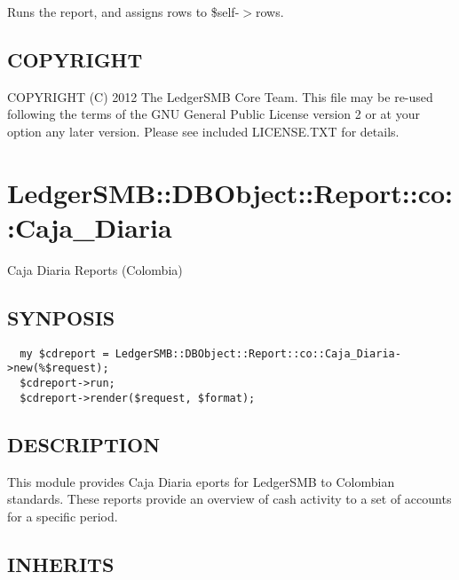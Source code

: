 \begin{description}
\begin{description}
\begin{description}
Runs the report, and assigns rows to \$self-$>$rows.

\subsection*{COPYRIGHT\label{LedgerSMB::DBObject::Report::co::Balance_y_Mayor_COPYRIGHT}}


COPYRIGHT (C) 2012 The LedgerSMB Core Team.  This file may be re-used following
the terms of the GNU General Public License version 2 or at your option any
later version.  Please see included LICENSE.TXT for details.

\section{LedgerSMB::DBObject::Report::co::Caja\_Diaria\label{LedgerSMB::DBObject::Report::co::Caja_Diaria}}


Caja Diaria Reports (Colombia)

\subsection*{SYNPOSIS\label{LedgerSMB::DBObject::Report::co::Caja_Diaria_SYNPOSIS}}
\begin{verbatim}
  my $cdreport = LedgerSMB::DBObject::Report::co::Caja_Diaria->new(%$request);
  $cdreport->run;
  $cdreport->render($request, $format);
\end{verbatim}
\subsection*{DESCRIPTION\label{LedgerSMB::DBObject::Report::co::Caja_Diaria_DESCRIPTION}}


This module provides Caja Diaria eports for LedgerSMB to Colombian standards.
These reports provide an overview of cash activity to a set of accounts for a
specific period.

\subsection*{INHERITS\label{LedgerSMB::DBObject::Report::co::Caja_Diaria_INHERITS}}
\begin{description}


\end{description}
\end{description}
\end{description}
\end{description}

